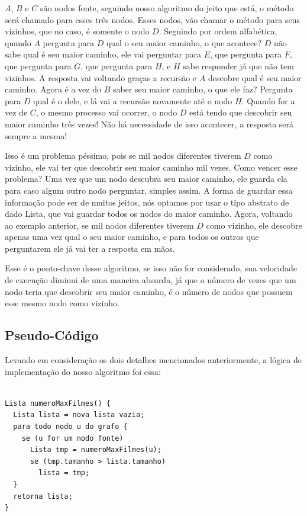 \documentclass[12pt]{article}
\begin{document}
$A$, $B$ e $C$ são nodos fonte, seguindo nosso algoritmo do jeito que está, o
método será chamado para esses três nodos. Esses nodos, vão chamar o método para
seus vizinhos, que no caso, é somente o nodo $D$. Seguindo por ordem alfabética,
quando $A$ pergunta para $D$ qual o seu maior caminho, o que acontece? $D$ não
sabe qual é seu maior caminho, ele vai perguntar para $E$, que pergunta para
$F$, que pergunta para $G$, que pergunta para $H$, e $H$ sabe responder já que
não tem vizinhos. A resposta vai voltando graças a recursão e $A$ descobre qual
é seu maior caminho. Agora é a vez do $B$ saber seu maior caminho, o que ele
faz? Pergunta para $D$ qual é o dele, e lá vai a recursão novamente até o nodo
$H$. Quando for a vez de $C$, o mesmo processo vai ocorrer, o nodo $D$ está
tendo que descobrir seu maior caminho três vezes! Não há necessidade de isso
acontecer, a resposta será sempre a mesma!

Isso é um problema péssimo, pois se mil nodos diferentes tiverem $D$ como
vizinho, ele vai ter que descobrir seu maior caminho mil vezes. Como vencer esse
problema? Uma vez que um nodo descubra seu maior caminho, ele guarda ela para
caso algum outro nodo perguntar, simples assim. A forma de guardar essa
informação pode ser de muitos jeitos, nós optamos por usar o tipo abstrato de
dado Lista, que vai guardar todos os nodos do maior caminho. Agora, voltando ao
exemplo anterior, se mil nodos diferentes tiverem $D$ como vizinho, ele descobre
apenas uma vez qual o seu maior caminho, e para todos os outros que perguntarem
ele já vai ter a resposta em mãos.

Esse é o ponto-chave desse algoritmo, se isso não for considerado, sua
velocidade de execução diminui de uma maneira absurda, já que o número de vezes
que um nodo teria que descobrir seu maior caminho, é o número de nodos que
possuem esse mesmo nodo como vizinho.

\subsection{Pseudo-Código}

Levando em consideração os dois detalhes mencionados anteriormente, a lógica de
implementação do nosso algoritmo foi essa:

\begin{lstlisting}

Lista numeroMaxFilmes() {
  Lista lista = nova lista vazia;
  para todo nodo u do grafo {
    se (u for um nodo fonte)
      Lista tmp = numeroMaxFilmes(u);
      se (tmp.tamanho > lista.tamanho)
        lista = tmp;
  }
  retorna lista;
}

\end{lstlisting}
\end{document}
